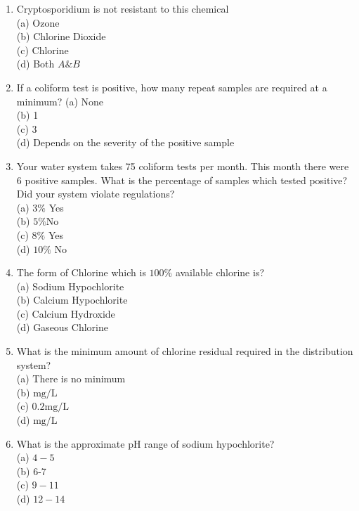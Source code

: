 \documentclass[10pt]{article}
\begin{document}
\begin{enumerate}
\begin{enumerate}
\begin{enumerate}
  \item Cryptosporidium is not resistant to this chemical\\
(a) Ozone\\
(b) Chlorine Dioxide\\
(c) Chlorine\\
(d) Both $A \& B$

  \item If a coliform test is positive, how many repeat samples are required at a minimum?
(a) None\\
(b) 1\\
(c) 3\\
(d) Depends on the severity of the positive sample\\

  \item Your water system takes 75 coliform tests per month. This month there were 6 positive samples. What is the percentage of samples which tested positive? Did your system violate regulations?\\
(a) $3 \%$ Yes\\
(b) $5 \% \mathrm{No}$\\
(c) $8 \%$ Yes\\
(d) $10 \%$ No\\

  \item The form of Chlorine which is $100 \%$ available chlorine is?\\
(a) Sodium Hypochlorite\\
(b) Calcium Hypochlorite\\
(c) Calcium Hydroxide\\
(d) Gaseous Chlorine\\

  \item What is the minimum amount of chlorine residual required in the distribution system?\\
(a) There is no minimum\\
(b) $\mathrm{mg} / \mathrm{L}$\\
(c) $0.2 \mathrm{mg} / \mathrm{L}$\\
(d) $\mathrm{mg} / \mathrm{L}$\\

  \item What is the approximate $\mathrm{pH}$ range of sodium hypochlorite?\\
(a) $4-5$\\
(b) 6-7\\
(c) $9-11$\\
(d) $12-14$\\


\end{enumerate}
\end{enumerate}
\end{enumerate}
\end{document}

